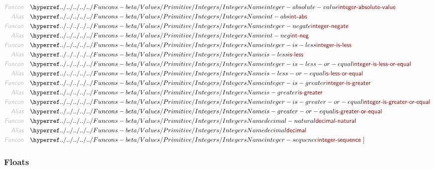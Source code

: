 \begin{align*}
  \KEY{Funcon} \quad & \NAMEHYPER{../../../../../Funcons-beta/Values/Primitive}{Integers}{integer-absolute-value} \\
  \KEY{Alias} \quad & \NAMEHYPER{../../../../../Funcons-beta/Values/Primitive}{Integers}{int-abs} \\
  \KEY{Funcon} \quad & \NAMEHYPER{../../../../../Funcons-beta/Values/Primitive}{Integers}{integer-negate} \\
  \KEY{Alias} \quad & \NAMEHYPER{../../../../../Funcons-beta/Values/Primitive}{Integers}{int-neg} \\
  \KEY{Funcon} \quad & \NAMEHYPER{../../../../../Funcons-beta/Values/Primitive}{Integers}{integer-is-less} \\
  \KEY{Alias} \quad & \NAMEHYPER{../../../../../Funcons-beta/Values/Primitive}{Integers}{is-less} \\
  \KEY{Funcon} \quad & \NAMEHYPER{../../../../../Funcons-beta/Values/Primitive}{Integers}{integer-is-less-or-equal} \\
  \KEY{Alias} \quad & \NAMEHYPER{../../../../../Funcons-beta/Values/Primitive}{Integers}{is-less-or-equal} \\
  \KEY{Funcon} \quad & \NAMEHYPER{../../../../../Funcons-beta/Values/Primitive}{Integers}{integer-is-greater} \\
  \KEY{Alias} \quad & \NAMEHYPER{../../../../../Funcons-beta/Values/Primitive}{Integers}{is-greater} \\
  \KEY{Funcon} \quad & \NAMEHYPER{../../../../../Funcons-beta/Values/Primitive}{Integers}{integer-is-greater-or-equal} \\
  \KEY{Alias} \quad & \NAMEHYPER{../../../../../Funcons-beta/Values/Primitive}{Integers}{is-greater-or-equal} \\
  \KEY{Funcon} \quad & \NAMEHYPER{../../../../../Funcons-beta/Values/Primitive}{Integers}{decimal-natural} \\
  \KEY{Alias} \quad & \NAMEHYPER{../../../../../Funcons-beta/Values/Primitive}{Integers}{decimal} \\
  \KEY{Funcon} \quad & \NAMEHYPER{../../../../../Funcons-beta/Values/Primitive}{Integers}{integer-sequence}
  \ ]
\end{align*}
\subsubsection{Floats}\hypertarget{floats}{}\label{floats}

